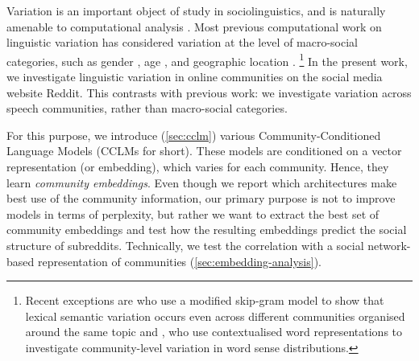 \documentclass[11pt]{article}
\begin{document}
Variation is an important object of study in sociolinguistics,
and is naturally amenable to computational analysis \citep{Nguyen2016}.
Most previous computational work on linguistic variation 
has considered variation at the level of macro-social categories, such as gender
\citep{Burger2011,Ciot2013,Bamman2014}, age \citep{Nguyen2013}, and
geographic location \citep{Eisenstein2010,Bamman2014a}.%
\footnote{Recent exceptions are \citet{DelTredici2017} who use a modified
skip-gram model to show that lexical semantic variation occurs even across 
different communities organised around the same topic and 
\citet{Lucy2021}, who use contextualised word representations to
investigate community-level variation in word sense distributions.}
In the present work, we investigate linguistic variation
in online communities on the social media website Reddit. 
This contrasts with previous work: we investigate variation across 
speech communities, rather than macro-social categories.


%  
%
%

For this purpose, we introduce (\cref{sec:cclm}) various
Community-Conditioned Language Models (CCLMs for short). These models
are conditioned on a vector representation (or embedding), which
varies for each community. Hence, they learn \emph{community
  embeddings}.  Even though we report which architectures make best use
of the community information, our primary purpose is not to improve models in
terms of perplexity, but rather we want to extract the best set of
community embeddings and test how the resulting embeddings
predict the social structure of subreddits. Technically, we test
the correlation with a social network-based representation of
communities (\cref{sec:embedding-analysis}).
\end{document}
